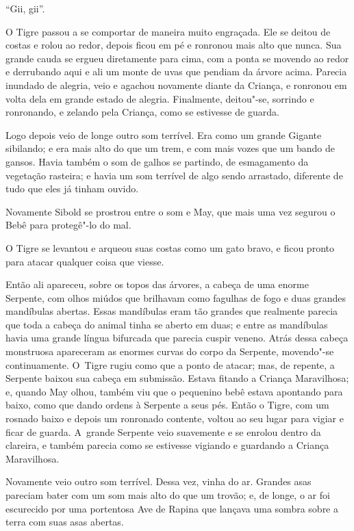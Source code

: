 ``Gii, gii''.

O Tigre passou a se comportar de maneira muito engraçada. Ele se deitou
de costas e rolou ao redor, depois ficou em pé e ronronou mais alto que
nunca. Sua grande cauda se ergueu diretamente para cima, com a ponta se
movendo ao redor e derrubando aqui e ali um monte de uvas que pendiam da
árvore acima. Parecia inundado de alegria, veio e agachou novamente
diante da Criança, e ronronou em volta dela em grande estado de alegria.
Finalmente, deitou"-se, sorrindo e ronronando, e zelando pela Criança,
como se estivesse de guarda.

Logo depois veio de longe outro som terrível. Era como um grande Gigante
sibilando; e era mais alto do que um trem, e com mais vozes que um bando
de gansos. Havia também o som de galhos se partindo, de esmagamento da
vegetação rasteira; e havia um som terrível de algo sendo arrastado,
diferente de tudo que eles já tinham ouvido.

Novamente Sibold se prostrou entre o som e May, que mais uma vez segurou
o Bebê para protegê"-lo do mal.

O Tigre se levantou e arqueou suas costas como um gato bravo, e ficou
pronto para atacar qualquer coisa que viesse.

Então ali apareceu, sobre os topos das árvores, a cabeça de uma enorme
Serpente, com olhos miúdos que brilhavam como fagulhas de fogo e duas
grandes mandíbulas abertas. Essas mandíbulas eram tão grandes que
realmente parecia que toda a cabeça do animal tinha se aberto em duas; e
entre as mandíbulas havia uma grande língua bifurcada que parecia cuspir
veneno. Atrás dessa cabeça monstruosa apareceram as enormes curvas do
corpo da Serpente, movendo"-se continuamente. O~Tigre rugiu como que a
ponto de atacar; mas, de repente, a Serpente baixou sua cabeça em
submissão. Estava fitando a Criança Maravilhosa; e, quando May olhou,
também viu que o pequenino bebê estava apontando para baixo, como que
dando ordens à Serpente a seus pés. Então o Tigre, com um rosnado baixo
e depois um ronronado contente, voltou ao seu lugar para vigiar e ficar
de guarda. A~grande Serpente veio suavemente e se enrolou dentro da
clareira, e também parecia como se estivesse vigiando e guardando a
Criança Maravilhosa.

Novamente veio outro som terrível. Dessa vez, vinha do ar. Grandes asas
pareciam bater com um som mais alto do que um trovão; e, de longe, o ar
foi escurecido por uma portentosa Ave de Rapina que lançava uma sombra
sobre a terra com suas asas abertas.

